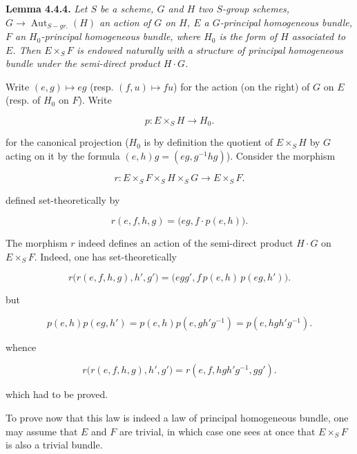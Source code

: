 

\textbf{Lemma 4.4.4.} \emph{Let \(S\) be a scheme, \(G\) and \(H\) two \(S\)-group schemes, \(G \to \operatorname{Aut}_{S-gr.}(H)\) an
action of \(G\) on \(H\), \(E\) a \(G\)-principal homogeneous bundle, \(F\) an \(H_0\)-principal homogeneous bundle, where \(H_0\) is
the form of \(H\) associated to \(E\). Then \(E \times_{S} F\) is endowed naturally with a structure of principal homogeneous
bundle under the semi-direct product \(H \cdot G\).}

Write \((e, g) \mapsto eg\) (resp. \((f, u) \mapsto f u\)) for the action (on the right) of \(G\) on \(E\) (resp. of \(H_0\) on
\(F\)). Write

\[
  p:E\times_S H\longrightarrow H_0.
\]

for the canonical projection (\(H_0\) is by definition the quotient of \(E \times_{S} H\) by \(G\) acting on it by the formula
\((e, h) g = (eg, g^{-1} h g)\)). Consider the morphism

\[
  r:E\times_S F\times_S H\times_S G\longrightarrow E\times_S F.
\]

defined set-theoretically by

\[
  r(e,f,h,g)=\bigl(eg,f\cdot p(e,h)\bigr).
\]

The morphism \(r\) indeed defines an action of the semi-direct product \(H \cdot G\) on \(E \times_{S} F\). Indeed, one has
set-theoretically

\[
  r\bigl(r(e,f,h,g),h',g'\bigr)
  =\bigl(egg',f\,p(e,h)\,p(eg,h')\bigr).
\]

but

\[
  p(e,h)p(eg,h')
  =p(e,h)p(e,gh'g^{-1})
  =p(e,hgh'g^{-1}).
\]

whence

\[
  r\bigl(r(e,f,h,g),h',g'\bigr)
  =r(e,f,hgh'g^{-1},gg').
\]

which had to be proved.

To prove now that this law is indeed a law of principal homogeneous bundle, one may assume that \(E\) and \(F\) are trivial,
in which case one sees at once that \(E \times_{S} F\) is also a trivial bundle.

